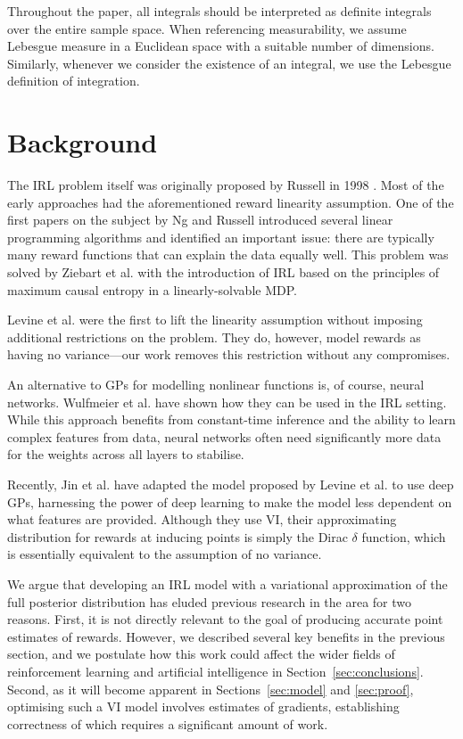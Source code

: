 \documentclass{mpaper}
\begin{document}
Throughout the paper, all integrals should be interpreted as definite integrals
over the entire sample space. When referencing measurability, we assume Lebesgue
measure in a Euclidean space with a suitable number of dimensions. Similarly,
whenever we consider the existence of an integral, we use the Lebesgue
definition of integration.

\section{Background} %

The IRL problem itself was originally proposed by Russell in 1998
\cite{DBLP:conf/colt/Russell98}. Most of the early approaches had the
aforementioned reward linearity assumption. One of the first papers on the
subject by Ng and Russell \cite{DBLP:conf/icml/NgR00} introduced several linear
programming algorithms and identified an important issue: there are typically
many reward functions that can explain the data equally well. This problem was
solved by Ziebart et al. \cite{ziebart2008maximum} with the introduction of IRL
based on the principles of maximum causal entropy in a linearly-solvable MDP.

Levine et al. \cite{DBLP:conf/nips/LevinePK11} were the first to lift the
linearity assumption without imposing additional restrictions on the problem.
They do, however, model rewards as having no variance---our work removes this
restriction without any compromises.

An alternative to GPs for modelling nonlinear functions is, of course, neural
networks. Wulfmeier et al. \cite{wulfmeier2015maximum} have shown how they can
be used in the IRL setting. While this approach benefits from constant-time
inference and the ability to learn complex features from data, neural
networks often need significantly more data for the weights across all layers to
stabilise.

Recently, Jin et al. \cite{DBLP:conf/uai/JinDAS17} have adapted the model
proposed by Levine et al. \cite{DBLP:conf/nips/LevinePK11} to use deep GPs,
harnessing the power of deep learning to make the model less dependent on what
features are provided. Although they use VI, their approximating distribution
for rewards at inducing points is simply the Dirac $\delta$ function, which is
essentially equivalent to the assumption of no variance.

We argue that developing an IRL model with a variational approximation of the
full posterior distribution has eluded previous research in the area for two
reasons. First, it is not directly relevant to the goal of producing accurate
point estimates of rewards. However, we described several key benefits in the
previous section, and we postulate how this work could affect the wider fields
of reinforcement learning and artificial intelligence in
Section~\ref{sec:conclusions}. Second, as it will become apparent in
Sections~\ref{sec:model} and \ref{sec:proof}, optimising such a VI model
involves estimates of gradients, establishing correctness of which requires a
significant amount of work.
\end{document}
